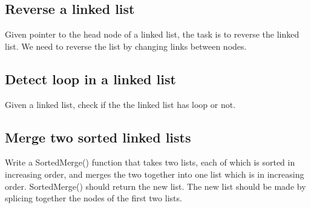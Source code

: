 \subsection{Reverse a linked list}
Given pointer to the head node of a linked list, the task is to reverse the linked list. We need to reverse the list by changing links between nodes.
    
\subsection{Detect loop in a linked list}    
Given a linked list, check if the the linked list has loop or not.

\subsection{Merge two sorted linked lists}
Write a SortedMerge() function that takes two lists, each of which is sorted in increasing order, and merges the two together into one list which is in increasing order. SortedMerge() should return the new list. The new list should be made by splicing together the nodes of the first two lists.

